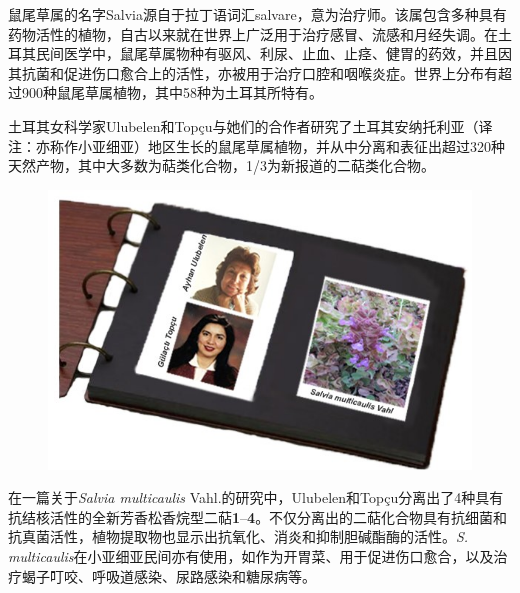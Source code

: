 鼠尾草属的名字Salvia源自于拉丁语词汇salvare，意为治疗师。该属包含多种具有药物活性的植物，自古以来就在世界上广泛用于治疗感冒、流感和月经失调。在土耳其民间医学中，鼠尾草属物种有驱风、利尿、止血、止痉、健胃的药效，并且因其抗菌和促进伤口愈合上的活性，亦被用于治疗口腔和咽喉炎症。世界上分布有超过900种鼠尾草属植物，其中58种为土耳其所特有。

土耳其女科学家Ulubelen和Topçu与她们的合作者研究了土耳其安纳托利亚（译注：亦称作小亚细亚）地区生长的鼠尾草属植物，并从中分离和表征出超过320种天然产物，其中大多数为萜类化合物，1/3为新报道的二萜类化合物。

\begin{figure}[h]
	\centering
	\includegraphics[width=12cm]{./pic/t1-1.jpg}
\end{figure}

在一篇关于\emph{Salvia multicaulis} Vahl.的研究中，Ulubelen和Topçu分离出了4种具有抗结核活性的全新芳香松香烷型二萜\textbf{1}--\textbf{4}。不仅分离出的二萜化合物具有抗细菌和抗真菌活性，植物提取物也显示出抗氧化、消炎和抑制胆碱酯酶的活性。\emph{S. multicaulis}在小亚细亚民间亦有使用，如作为开胃菜、用于促进伤口愈合，以及治疗蝎子叮咬、呼吸道感染、尿路感染和糖尿病等。

